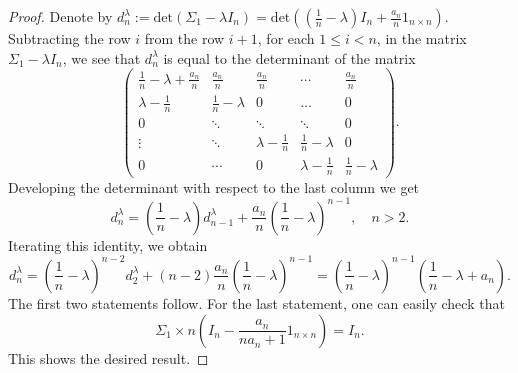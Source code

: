 \documentclass[reqno,a4paper]{amsart}
\theoremstyle{plain}
\theoremstyle{definition}
\theoremstyle{plain}
\theoremstyle{plain}
\theoremstyle{plain}
\begin{document}
\begin{proof}
Denote by $d_n^\lambda:=\text{det}(\Sigma_1-\lambda I_n)=\text{det}((\frac1{n}-\lambda)I_n+\frac{a_n}{n}1_{n\times n})$. Subtracting the row $i$ from the row $i+1$, for each $1\leq i<n$, in the matrix $\Sigma_1-\lambda I_n$, we see that $d_n^\lambda$ is equal to the determinant of the matrix
\begin{equation}
 \begin{pmatrix}
       \frac1{n}-\lambda+\frac{a_n}{n}&\frac{a_n}{n}&\frac{a_n}{n}&\cdots&\frac{a_n}{n}\\
      \lambda-\frac1{n}&\frac1{n}-\lambda&0&\ldots&0\\
       0&\ddots&\ddots&\ddots&0\\
       \vdots&\ddots&\lambda-\frac1{n}&\frac1{n}-\lambda&0\\
       0&\cdots&0&\lambda-\frac1{n}&\frac1{n}-\lambda
\end{pmatrix}.
\end{equation}
Developing the determinant with respect to the last column we get
$$d_n^\lambda=\left(\frac1{n}-\lambda\right)d_{n-1}^{\lambda}+\frac{a_n}{n}\left(\frac1{n}-\lambda\right)^{n-1},\quad n>2.$$
Iterating this identity, we obtain
$$d_n^\lambda=\left(\frac1{n}-\lambda\right)^{n-2}d_2^{\lambda}+(n-2)\frac{a_n}{n}\left(\frac1{n}-\lambda\right)^{n-1}=\left(\frac1{n}-\lambda\right)^{n-1}\left(\frac1{n}-\lambda+a_n\right).$$
The first two statements follow. For the last statement, one can easily check that
$$\Sigma_1\times n\left(I_n-\frac{a_n}{n a_n+1}1_{n\times n}\right)=I_n.$$
This shows the desired result.
\end{proof}
\end{document}
